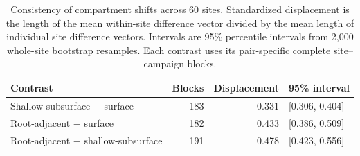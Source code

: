 \begin{table}[htbp]\centering\small
\caption{Consistency of compartment shifts across 60 sites. Standardized displacement is the length of the mean within-site difference vector divided by the mean length of individual site difference vectors. Intervals are 95\% percentile intervals from 2,000 whole-site bootstrap resamples. Each contrast uses its pair-specific complete site--campaign blocks.}
\label{tab:compartment-displacement}
\begin{tabular}{lrrl}\toprule
Contrast & Blocks & Displacement & 95\% interval \\\midrule
Shallow-subsurface $-$ surface & 183 & 0.331 & [0.306, 0.404] \\
Root-adjacent $-$ surface & 182 & 0.433 & [0.386, 0.509] \\
Root-adjacent $-$ shallow-subsurface & 191 & 0.478 & [0.423, 0.556] \\
\bottomrule\end{tabular}\end{table}
